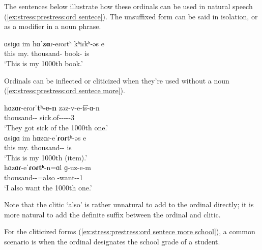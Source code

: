 The sentences below illustrate how these ordinals can be used in natural speech (\ref{ex:stress:prestress:ord sentece}). The unsuffixed form can be said in isolation, or as a modifier in a noun phrase. 

\begin{exe}
	\ex \gll ɑsiɡɑ im hɑˈ\textbf{zɑ}ɾ-eɾoɾtʰ kʰiɾkʰ-əs e
	\\
	this my.{\gen} thousand-{\ord} book-{\possFsg} is
	\\
	\trans `This is my 1000th book.'
	\label{ex:stress:prestress:ord sentece}
	\\
\end{exe}

Ordinals can be inflected or cliticized when they're used without a noun (\ref{ex:stress:prestress:ord sentece more}). 

\begin{exe}
	\ex \label{ex:stress:prestress:ord sentece more}
	\begin{xlist}
		\ex \gll  hɑzɑɾ-eɾoɾˈ\textbf{tʰ-e-n} zəz-v-e-t͡s-ɑ-n  
		\\
		thousand-{\ord}-{\abl}{} sick.of-{\pass}-{\thgloss}-{\aorperf}-{\pst}-3{\pl}
		\\
		\trans `They got sick of the 1000th one.'
		\\
		\ex \gll ɑsiɡɑ im hɑzɑɾ-eˈ\textbf{ɾoɾ}tʰ-əs e
		\\
		this my.{\gen} thousand-{\ord}-{\possFsg} is
		\\
		\trans `This is my 1000th (item).'
		\\
		\ex \gll hɑzɑɾ-eˈ\textbf{ɾoɾtʰ}-n=ɑl ɡ-uz-e-m
		\\
		thousand-{\ord}-{}=also {\ind}-want-{\thgloss}-1{\sg}
		\\
		\trans `I also want the 1000th one.'
		\\
		
	\end{xlist} 
\end{exe}

Note that the clitic `also' is rather unnatural to add to the ordinal directly; it is more natural to add the definite suffix between the ordinal and clitic. 

For the cliticized forms (\ref{ex:stress:prestress:ord sentece more school}), a common scenario is when the ordinal designates the school grade of a student. 

